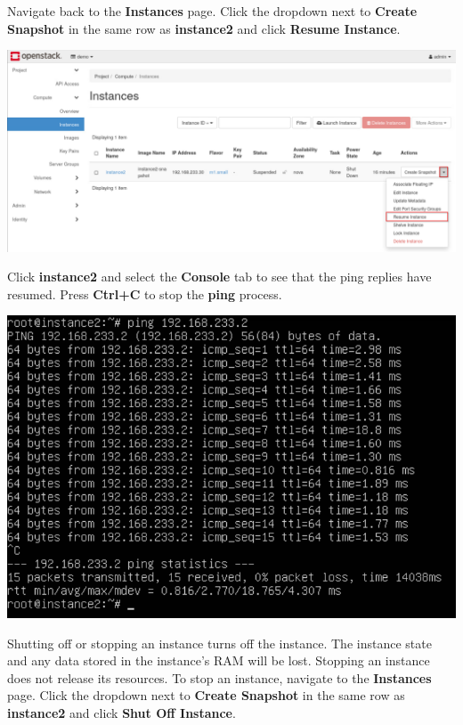 \documentclass[letterpaper, 12pt]{article}
\begin{document}
\begin{enumerate}
    \begin{labstep}
        Navigate back to the \textbf{Instances} page.
        Click the dropdown next to \textbf{Create Snapshot} in the same row as \textbf{instance2} and click \textbf{Resume Instance}.

        \begin{center}
            \includegraphics[width=\linewidth]{images/part3/step10.png}
        \end{center}
    \end{labstep}

    \begin{labstep}
        Click \textbf{instance2} and select the \textbf{Console} tab to see that the ping replies have resumed.
        Press \textbf{Ctrl+C} to stop the \textbf{ping} process.

        \begin{center}
            \includegraphics[width=\linewidth]{images/part3/step11.png}
        \end{center}
    \end{labstep}

    \begin{labstep}
        Shutting off or stopping an instance turns off the instance.
        The instance state and any data stored in the instance's RAM will be lost.
        Stopping an instance does not release its resources.
        To stop an instance, navigate to the \textbf{Instances} page.
        Click the dropdown next to \textbf{Create Snapshot} in the same row as \textbf{instance2} and click \textbf{Shut Off Instance}.


\end{labstep}
\end{enumerate}
\end{document}
